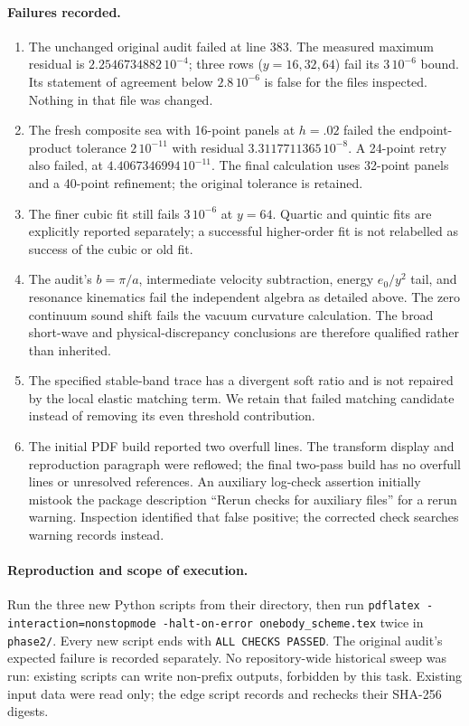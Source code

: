 \documentclass[11pt,a4paper]{article}
\begin{document}
\paragraph{Failures recorded.}
\begin{enumerate}
\item The unchanged original audit failed at line 383. The measured maximum
residual is $2.2546734882\,10^{-4}$; three rows ($y=16,32,64$) fail its
$3\,10^{-6}$ bound. Its statement of agreement below $2.8\,10^{-6}$ is
false for the files inspected. Nothing in that file was changed.
\item The fresh composite sea with 16-point panels at $h=.02$ failed the
endpoint-product tolerance $2\,10^{-11}$ with residual
$3.3117711365\,10^{-8}$. A 24-point retry also failed, at
$4.4067346994\,10^{-11}$. The final calculation uses 32-point panels
and a 40-point refinement; the original tolerance is retained.
\item The finer cubic fit still fails $3\,10^{-6}$ at $y=64$.
Quartic and quintic fits are explicitly reported separately; a successful
higher-order fit is not relabelled as success of the cubic or old fit.
\item The audit's $b=\pi/a$, intermediate velocity subtraction, energy
$e_0/y^2$ tail, and resonance kinematics fail the independent algebra as
detailed above. The zero continuum sound shift fails the vacuum curvature
calculation. The broad short-wave and physical-discrepancy conclusions
are therefore qualified rather than inherited.
\item The specified stable-band trace has a divergent soft ratio and is
not repaired by the local elastic matching term. We retain that failed
matching candidate instead of removing its even threshold contribution.
\item The initial PDF build reported two overfull lines. The transform
display and reproduction paragraph were reflowed; the final two-pass build
has no overfull lines or unresolved references. An auxiliary log-check
assertion initially mistook the package description ``Rerun checks for
auxiliary files'' for a rerun warning. Inspection identified that false
positive; the corrected check searches warning records instead.
\end{enumerate}

\paragraph{Reproduction and scope of execution.}
Run the three new Python scripts from their directory, then run
\texttt{pdflatex -interaction=nonstopmode -halt-on-error onebody\_scheme.tex}
twice in \texttt{phase2/}. Every new script ends with
\texttt{ALL CHECKS PASSED}. The original audit's expected failure is recorded
separately. No repository-wide historical sweep was run: existing scripts
can write non-prefix outputs, forbidden by this task. Existing input data
were read only; the edge script records and rechecks their SHA-256 digests.
\end{document}
